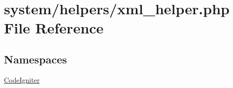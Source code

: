 \hypertarget{xml__helper_8php}{}\section{system/helpers/xml\+\_\+helper.php File Reference}
\label{xml__helper_8php}
\subsection*{Namespaces}
\begin{DoxyCompactItemize}
\item 
 \mbox{\hyperlink{namespace_code_igniter}{Code\+Igniter}}
\end{DoxyCompactItemize}
